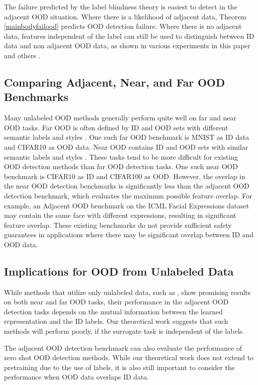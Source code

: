 \documentclass[11pt, oneside]{book}
\theoremstyle{plain}
\theoremstyle{definition}
\theoremstyle{remark}
\begin{document}
The failure predicted by the label blindness theory is easiest to detect in the adjacent OOD situation. Where there is a likelihood of adjacent data, Theorem \ref{mainbodyfailood} predicts OOD detection failure. Where there is no adjacent data, features independent of the label can still be used to distinguish between ID data and non adjacent OOD data, as shown in various experiments in this paper and others \citep{sehwag2021ssd, hendrycks2019using, liu2023unsupervised}.

\subsection{Comparing Adjacent, Near, and Far OOD Benchmarks}

Many unlabeled OOD methods generally perform quite well on far and near OOD tasks. Far OOD is often defined by ID and OOD sets with different semantic labels and styles \citep{fang2022out}. One such far OOD benchmark is MNIST as ID data and CIFAR10 as OOD data. Near OOD contains ID and OOD sets with similar semantic labels and styles \citep{fang2022out}. These tasks tend to be more difficult for existing OOD detection methods than far OOD detection tasks. One such near OOD benchmark is CIFAR10 as ID and CIFAR100 as OOD. However, the overlap in the near OOD detection benchmarks is significantly less than the adjacent OOD detection benchmark, which evaluates the maximum possible feature overlap. For example, an Adjacent OOD benchmark on the ICML Facial Expressions dataset may contain the same face with different expressions, resulting in significant feature overlap. These existing benchmarks do not provide sufficient safety guarantees in applications where there may be significant overlap between ID and OOD data.

\subsection{Implications for OOD from Unlabeled Data}

While methods that utilize only unlabeled data, such as \citet{sehwag2021ssd, liu2023unsupervised, guille2024cadet}, show promising results on both near and far OOD tasks, their performance in the adjacent OOD detection tasks depends on the mutual information between the learned representation and the ID labels. Our theoretical work suggests that such methods will perform poorly, if the surrogate task is independent of the labels.

The adjacent OOD detection benchmark can also evaluate the performance of zero shot OOD detection methods. While our theoretical work does not extend to pretraining due to the use of labels, it is also still important to consider the performance when OOD data overlaps ID data.
\end{document}
